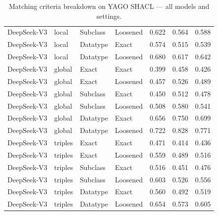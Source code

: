 \begin{table}[h]
\begin{tabular}{ll|ll|ccc}
DeepSeek-V3 & local & Subclass & Loosened & 0.622 & 0.564 & 0.588 \\
DeepSeek-V3 & local & Datatype & Exact & 0.574 & 0.515 & 0.539 \\
DeepSeek-V3 & local & Datatype & Loosened & 0.680 & 0.617 & 0.642 \\
DeepSeek-V3 & global & Exact & Exact & 0.399 & 0.458 & 0.426 \\
DeepSeek-V3 & global & Exact & Loosened & 0.457 & 0.526 & 0.489 \\
DeepSeek-V3 & global & Subclass & Exact & 0.450 & 0.512 & 0.478 \\
DeepSeek-V3 & global & Subclass & Loosened & 0.508 & 0.580 & 0.541 \\
DeepSeek-V3 & global & Datatype & Exact & 0.656 & 0.750 & 0.699 \\
DeepSeek-V3 & global & Datatype & Loosened & 0.722 & 0.828 & 0.771 \\
DeepSeek-V3 & triples & Exact & Exact & 0.471 & 0.414 & 0.436 \\
DeepSeek-V3 & triples & Exact & Loosened & 0.559 & 0.489 & 0.516 \\
DeepSeek-V3 & triples & Subclass & Exact & 0.516 & 0.451 & 0.476 \\
DeepSeek-V3 & triples & Subclass & Loosened & 0.603 & 0.526 & 0.556 \\
DeepSeek-V3 & triples & Datatype & Exact & 0.560 & 0.492 & 0.519 \\
DeepSeek-V3 & triples & Datatype & Loosened & 0.654 & 0.573 & 0.605 \\
\hline
\end{tabular}
\caption{Matching criteria breakdown on YAGO SHACL — all models and settings.}
\label{tab:t8-all-yago-criteria-shacl}
\end{table}
